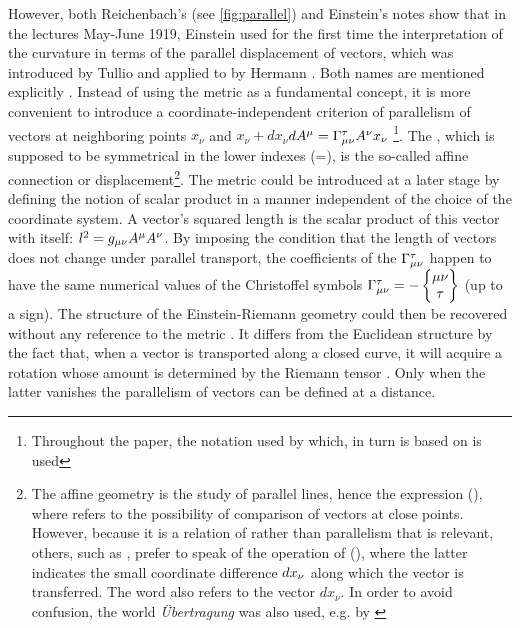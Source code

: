 \documentclass[draft]{article}
\newcommand{\xdx}{\ensuremath{x_\nu} and \ensuremath{x_\nu + dx_\nu}\xspace}
\begin{document}
However, both Reichenbach's (see \cref{fig:parallel}) and Einstein's notes show that in the lectures May-June 1919, Einstein used for the first time the interpretation of the curvature in terms of the parallel displacement of vectors, which was introduced by Tullio \citet{Levi-Civita1916} and applied to \rt by Hermann \citet{Weyl1918}. Both names are mentioned explicitly \citep[028-01-03, 33]{HR}. Instead of using the metric as a fundamental concept, it is more convenient to introduce a coordinate-independent criterion of parallelism of vectors at neighboring points \xdx $dA^\mu=\Gamma^\tau_{\mu\nu} A^\nu x_\nu$ \citep[028-01-03, 33]{HR}\footnote{Throughout the paper, the notation used by \citet{Reichenbach1928} which, in turn is based on \citet{Eddington1923,Eddington1925} is used}. The \Gtmn, which is supposed to be symmetrical in the lower indexes (\Gtmn=\Gtmn), is the so-called affine connection or displacement\footnote{The affine geometry is the study of parallel lines, \citet{Weyl1918b} hence the expression  (), where  refers to the possibility of comparison of vectors at close points. However, because it is a relation of  rather than parallelism that is relevant, others, such as \citet{Reichenbach1928a}, prefer to speak of the operation of  (), where the latter indicates the small coordinate difference $dx_{\nu}$ along which the vector is transferred. The word  also refers to the vector $dx_\nu$. In order to avoid confusion, the world  \textit{Übertragung} was also used, e.g. by \citet{Schouten1922}}. The metric could be introduced at a later stage by defining the notion of scalar product in a manner independent of the choice of the coordinate system. A vector's squared length is the scalar product of this vector with itself: $l^2=g_{\mu\nu} A^\mu A^\nu$. By imposing the condition that the length of vectors does not change under parallel transport, the coefficients of the $\Gamma^\tau_{\mu\nu}$ happen to have the same numerical values of the Christoffel symbols $\Gamma^\tau_{\mu\nu} = - \begin{Bmatrix} \mu \nu \\ \tau \end{Bmatrix}$ (up to a sign). The structure of the Einstein-Riemann geometry could then be recovered without any reference to the metric \gmn. It differs from the Euclidean structure by the fact that, when a vector is transported along a closed curve, it will acquire a rotation whose amount is determined by the Riemann tensor \riteg. Only when the latter vanishes the parallelism of vectors can be defined at a distance.
\end{document}
